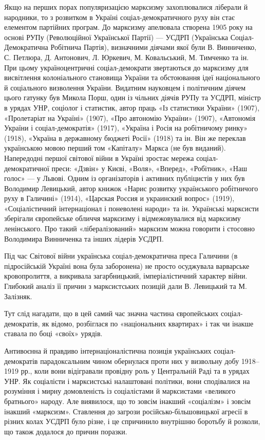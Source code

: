 Якщо на перших порах популяризацією марксизму захоплювалися ліберали 
й народники, то з розвитком в Україні соціал-демократичного руху він 
стає елементом партійних програм. До марксизму апелювала створена 1905 
року на основі РУПу (Революційної Української Партії) — УСДРП 
(Українська Соціал-Демократична Робітнича Партія), визначними діячами 
якої були В. Винниченко, С. Петлюра, Д. Антонович, Л. Юркевич, М. 
Ковальський, М. Тимченко та ін. При цьому україноцентричні 
соціал-демократи звертаються до марксизму для висвітлення 
колоніального становища України та обстоювання ідеї національного й 
соціального визволення України. Видатним науковцем і політичним 
діячем цього гатунку був Микола Порш, один із чільних діячів РУПу та 
УСДРП, міністр в урядах УНР, соціолог і статистик, автор праць «Із 
статистики України» (1907), «Пролетаріат на Україні» (1907), «Про автономію 
України» (1907), «Автономія України і соціал-демократія» (1917), «Україна і 
Росія на робітничому ринку» (1918), «Україна в державному бюджеті Росії» 
(1918) та ін. Він же переклав українською мовою перший том «Капіталу» 
Маркса (не був виданий). Напередодні першої світової війни в Україні 
зростає мережа соціал-демократичної преси: «Дзвін» у Києві, «Воля», 
«Вперед», «Робітник», «Наш голос» — у Львові. Одним із організаторів і 
активних публіцистів у них був Володимир Левицький, автор книжок 
«Нарис розвитку українського робітничого руху в Галичині» (1914), 
«Царская Россия и украинский вопрос» (1919), «Соціалістичний 
інтернаціонал і поневолені народи» та ін. Українські марксисти 
зберігали європейське обличчя марксизму і відмежовувалися від 
марксизму ленінського. Про такий «лібералізований» марксизм можна 
говорити і стосовно Володимира Винниченка та інших лідерів УСДРП. 


Під час Світової війни українська соціал-демократична преса Галичини 
(в підросійській Україні вона була заборонена) не просто осуджувала 
варварське кровопролиття, а викривала загарбницький, 
імперіалістичний характер війни. Глибокий аналіз її причин з 
марксистських позицій дали В. Левицький та М. Залізняк. 


Тут слід нагадати, що в цей самий час значна частина європейських 
соціал-демократів, як відомо, розбіглася по «національних квартирах» 
і так чи інакше ставала по боці «своїх» урядів. 


Антивоєнна й правдиво інтернаціоналістична позиція українських 
соціал-демократів парадоксальним чином обернулася проти них у 
визвольну добу 1918--1919 рр., коли вони відігравали провідну роль у 
Центральній Раді та в урядах УНР. Як соціалісти і марксистські 
налаштовані політики, вони сподівалися на розуміння і мирну 
домовленість із соціалістами й марксистами «великого братнього» 
народу. Але виявилося, що то зовсім інакший «соціалізм» і зовсім 
інакший «марксизм». Ставлення до загрози російсько-більшовицької 
агресії в різних колах УСДРП було різне, і це спричинило внутрішню 
боротьбу й розколи, що також додалося до причин поразки. 


